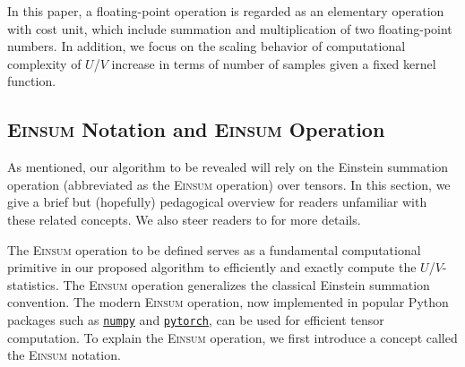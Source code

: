 \documentclass[12pt]{article}
\newcommand{\libref}[2]{\href{#2}{\texttt{#1}}}
\theoremstyle{plain}
\theoremstyle{definition}
\def\Einsum{\textsc{Einsum}}
\newcommand{\numpy}{\libref{numpy}{https://numpy.org/}}
\newcommand{\torch}{\libref{pytorch}{https://pytorch.org/}}
\begin{document}
\begin{bibunit}[agsm]
In this paper, a floating-point operation is regarded as an elementary operation with cost unit, which include summation and multiplication of two floating-point numbers. In addition, we focus on the scaling behavior of computational complexity of $U$/$V$ increase in terms of number of samples given a fixed kernel function.
\fi

\subsection{\Einsum{} Notation and \Einsum{} Operation}
\label{sec:pre_tensor_contraction}

As mentioned, our algorithm to be revealed will rely on the Einstein summation operation (abbreviated as the \Einsum{} operation) over tensors. In this section, we give a brief but (hopefully) pedagogical overview for readers unfamiliar with these related concepts. We also steer readers to \citet{blacher2024einsum} for more details. %

The \Einsum{} operation to be defined serves as a fundamental computational primitive in our proposed algorithm to efficiently and exactly compute the $U$/$V$-statistics. The \Einsum{} operation generalizes the classical Einstein summation convention. The modern \Einsum{} operation, now implemented in popular Python packages such as \numpy{} and \torch{}, can be used for efficient tensor computation. To explain the \Einsum{} operation, we first introduce a concept called the \Einsum{} notation.


\end{bibunit}
\end{document}
